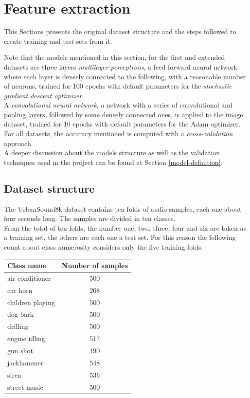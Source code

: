 \section{Feature extraction}
\label{feature-extraction}

This Sections presents the original dataset structure and the 
steps followed to create training and test sets from it.

Note that the models mentioned in this section, for the first and 
extended datasets are
three layers \emph{multilayer perceptrons}, 
a feed forward neural network where each layer 
is densely connected  to the following, 
with a reasonable number of neurons, trained 
for 100 epochs with default parameters for the \emph{stochastic gradient 
descent optimizer}.~\cite{mlp}\cite{sgd}\\
A \emph{convolutional neural network}, a network with 
a series of convolutional and pooling layers, followed by 
some densely connected ones, is applied to the image dataset, trained for 10 epochs
with default parameters for the Adam optimizer.~\cite{cnn} \\
For all datasets, the accuracy mentioned is computed with a \emph{cross-validation} 
approach.~\cite{cross}\\

A deeper discussion about the models structure as well as the validation
techniques used in the project can be found at Section \vref{model-definition}.

\subsection{Dataset structure}
\label{dataset-structure}

The UrbanSound8k dataset contains ten folds of audio samples, each one about 
four seconds long. The samples are divided in ten classes.\\
From the total of ten folds, the number one, two, three, four and six 
are taken as a training set, the others are each one a test set.
For this reason the following count about class numerosity considers
only the five training folds.

\begin{center}
    \begin{tabular}{ |l|c| } 
        \hline
        Class name & Number of samples \\
        \hline
        air conditioner & 500 \\
        car horn & 208 \\
        children playing & 500 \\
        dog bark & 500 \\
        drilling & 500 \\
        engine idling & 517 \\
        gun shot & 190 \\
        jackhammer & 548 \\
        siren & 536 \\
        street music & 500 \\
        \hline
    \end{tabular}
\end{center}

